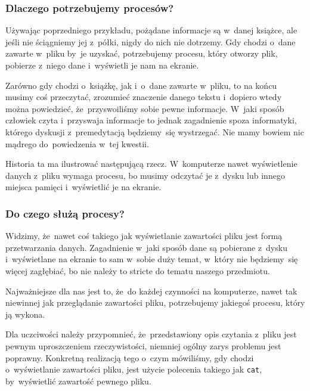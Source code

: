 \documentclass[10pt,t]{beamer}
\begin{document}
\begin{frame}
  \frametitle{Dlaczego potrzebujemy procesów?}


  Używając poprzedniego przykładu, pożądane informacje są  w~danej książce,
  ale jeśli nie ściągniemy jej z~półki, nigdy do nich nie dotrzemy. Gdy
  chodzi o~dane zawarte w~pliku by~je uzyskać, potrzebujemy procesu, który
  otworzy plik, pobierze z~niego dane i~wyświetli je nam na ekranie.

  Zarówno gdy chodzi o~książkę, jak i~o~dane zawarte w~pliku, to na końcu
  musimy coś przeczytać, zrozumieć znaczenie danego tekstu i~dopiero wtedy
  można powiedzieć, że~przyswoiliśmy sobie pewne informacje. W~jaki sposób
  człowiek czyta i~przyswaja informacje to jednak zagadnienie spoza
  informatyki, którego dyskusji z~premedytacją będziemy~się wystrzegać.
  Nie mamy bowiem nic mądrego do~powiedzenia w~tej kwestii.

  Historia ta ma ilustrować następującą rzecz. W~komputerze nawet
  wyświetlenie danych z~pliku wymaga procesu, bo musimy odczytać je z~dysku
  lub innego miejsca pamięci i~wyświetlić je na ekranie.

\end{frame}





\begin{frame}
  \frametitle{Do czego służą procesy?}


  Widzimy, że~nawet coś takiego jak wyświetlanie zawartości pliku jest
  formą przetwarzania danych. Zagadnienie w~jaki sposób dane są pobierane
  z~dysku i~wyświetlane na ekranie to sam w~sobie duży temat, w~który nie
  będziemy~się więcej zagłębiać, bo nie należy to stricte do tematu
  naszego przedmiotu.

  Najważniejsze dla nas jest to, że~do każdej czynności na komputerze,
  nawet tak niewinnej jak przeglądanie zawartości pliku, potrzebujemy
  jakiegoś procesu, który ją wykona.

  Dla uczciwości należy przypomnieć, że~przedstawiony opis czytania z~pliku
  jest pewnym uproszczeniem rzeczywistości, niemniej ogólny zarys problemu
  jest poprawny. Konkretną realizacją tego o~czym mówiliśmy, gdy chodzi
  o~wyświetlanie zawartości pliku, jest użycie polecenia takiego jak
  \texttt{cat}, by~wyświetlić zawartość pewnego pliku.

\end{frame}
\end{document}

